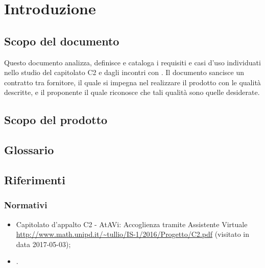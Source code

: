 \section{Introduzione}
 \subsection{Scopo del documento}
 Questo documento analizza, definisce e cataloga i requisiti e casi d'uso individuati nello studio del capitolato C2 e dagli incontri con \PROPONENTE. 
 Il documento sancisce un contratto tra fornitore, il quale si impegna nel realizzare il prodotto con le qualità descritte,  e il proponente il quale riconosce che tali qualità sono quelle desiderate. 
 \subsection{Scopo del prodotto}
 \SCOPO
 \subsection{Glossario}
 \GLOSSARIO
 \subsection{Riferimenti}
  \subsubsection{Normativi}
  \begin{itemize}
  	\item Capitolato d'appalto C2 - AtAVi: Accoglienza tramite Assistente Virtuale \\
  	\url{http://www.math.unipd.it/~tullio/IS-1/2016/Progetto/C2.pdf} (visitato in data 2017-05-03);
    \item \NPdoc.
  \end{itemize}
